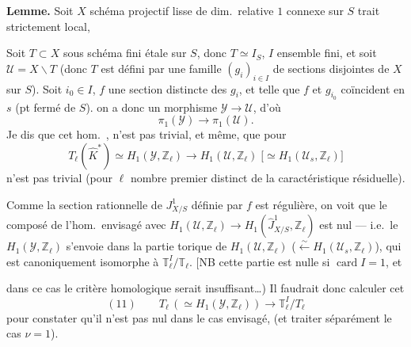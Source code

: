 \documentclass[11pt,a4paper]{article}
\begin{document}
\textbf{Lemme.} Soit $X$ schéma projectif lisse de dim.\ relative $1$ connexe sur $S$ trait strictement local,

Soit $T \subset X$ sous schéma fini étale sur $S$, donc $T \simeq I_S$, $I$ ensemble fini, et soit $\mathcal{U} = X \smallsetminus T$ (donc $T$ est défini par une famille $(g_i)_{i \in I}$ de sections disjointes de $X$ sur $S$). Soit  $i_0 \in I$, $f$ une section   distincte des $g_i$, et telle que  $f$ et $g_{i_0}$ coïncident en $s$ (pt fermé de $S$).     on a donc un morphisme $\mathcal{Y} \to \mathcal{U}$, d'où
\[
\pi_1(\mathcal{Y}) \longrightarrow \pi_1(\mathcal{U}).
\]
Je dis que cet hom.\ , n'est pas trivial, \struck{\ill{}} et même, que pour 
\[
T_\ell(\widehat{K}^{*}) \simeq H_1(\mathcal{Y}, \mathbb{Z}_\ell) \longrightarrow H_1(\mathcal{U}, \mathbb{Z}_\ell) \;\bigl[\simeq H_1(\mathcal{U}_s, \mathbb{Z}_\ell)\bigr]
\]
n'est pas trivial (pour \struck{\ill{}} $\ell$ nombre premier distinct de la caractéristique résiduelle).


Comme la section rationnelle de $J^{1}_{X/S}$ définie par $f$ est régulière, on voit que le composé de l'hom.\ envisagé avec $H_1(\mathcal{U}, \mathbb{Z}_\ell) \to H_1(\widehat{J}^{1}_{X/S}, \mathbb{Z}_\ell)$ est nul --- i.e.\ le $H_1(\mathcal{Y}, \mathbb{Z}_\ell)$ s'envoie dans la partie torique de $H_1(\mathcal{U}, \mathbb{Z}_\ell)$ ($\xleftarrow{\sim} H_1(\mathcal{U}_s, \mathbb{Z}_\ell)$), qui est canoniquement isomorphe à $\mathbb{T}_\ell^{I} / \mathbb{T}_\ell$.
[NB cette partie est nulle si $\operatorname{card} I = 1$, et



dans ce cas le critère homologique serait insuffisant…) Il faudrait donc calculer cet  
\[
(11)\qquad T_\ell\,(\simeq H_1(\mathcal{Y}, \mathbb{Z}_\ell)) \longrightarrow \mathbb{T}_\ell^{I} / T_\ell
\]
pour constater qu'il n'est pas nul dans le cas envisagé,  (et traiter séparément le cas $\nu = 1$).
\end{document}
